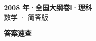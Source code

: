 \documentclass[zihao=-4, a4paper]{ctexart}
\begin{document}
\begin{center}
  {\Large\bfseries 2008 年·全国大纲卷Ⅰ·理科}\\[4pt]
  {\large 数学 · 简答版}
\end{center}
\medskip
{}

\clearpage
{}
\begin{center}{\Large\bfseries 答案速查}\end{center}
\medskip

\end{document}
